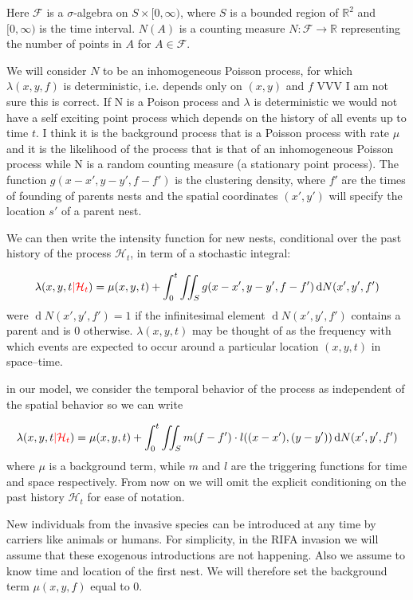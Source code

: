 \documentclass[11pt,a4paper]{article}
\renewcommand{\d}[1]{\ensuremath{\operatorname{d}\!{#1}}}
\begin{document}
Here $\mathcal{F}$ is a $\sigma$-algebra on $S \times [0, \infty )$, where $S$ is a bounded region of $\mathbb{R}^2$ and $[0, \infty)$ is the time interval. $N(A)$ is a counting measure $N: \mathcal{F} \to \mathbb{R}$ representing the number of points in $A$ for $A \in \mathcal{F}$.

We will consider $N$ to be an inhomogeneous Poisson process, for which $\lambda(x, y, f)$ is deterministic, i.e. depends only on $(x, y)$ and $f$ \cite{Shoenberg} {\color{red}VVV I am not sure this is correct. If N is a Poison process and $\lambda$ is deterministic we would not have a self exciting point process which depends on the history of all events up to time $t$. I think it is the background process that is a Poisson process with rate $\mu$ and it is the likelihood of the process that is that of an inhomogeneous Poisson process while N is a random counting measure (a stationary point process)}. The function $g(x - x', y - y', f - f')$ is the clustering density, where $f'$ are the times of founding of parents nests and the spatial coordinates $(x', y')$ will specify the location $s'$ of a parent nest.

We can then write the intensity function for new nests, {\color{red} conditional over the past history of the process $\mathcal{H}_t$}, in term of a stochastic integral:

\[
\lambda(x, y, t {\color{red}| \mathcal{H}_t}) = \mu(x, y, t) + \int_{0}^{t} \iint_{S} g(x - x', y - y', f - f') \d N(x', y', f')
\]
were $\d N(x', y', f') = 1$ if the infinitesimal element $\d N(x', y', f')$ contains a parent and is 0 otherwise. $\lambda(x, y, t)$ may be thought of as the frequency with which events are expected to occur around a particular location $(x, y, t)$ in space–time.

in our model, we consider the temporal behavior of the process as independent of the spatial behavior so we can write

\[
\lambda(x, y, t {\color{red}| \mathcal{H}_t}) = \mu(x, y, t) + \int_{0}^{t} \iint_{S} m(f-f') \cdot l((x - x'), (y - y')) \d N(x', y', f')
\]
where $\mu$ is a background term, while $m$ and $l$ are the triggering functions for time and space respectively. {\color{red} From now on we will omit the explicit conditioning on the past history $\mathcal{H}_t$ for ease of notation.}

New individuals from the invasive species can be introduced at any time by carriers like animals or humans. For simplicity, in the RIFA invasion we will assume that these exogenous introductions are not happening. Also we assume to know time and location of the first nest.  We will therefore set the background term $\mu(x, y, f) $ equal to 0. 
\end{document}
